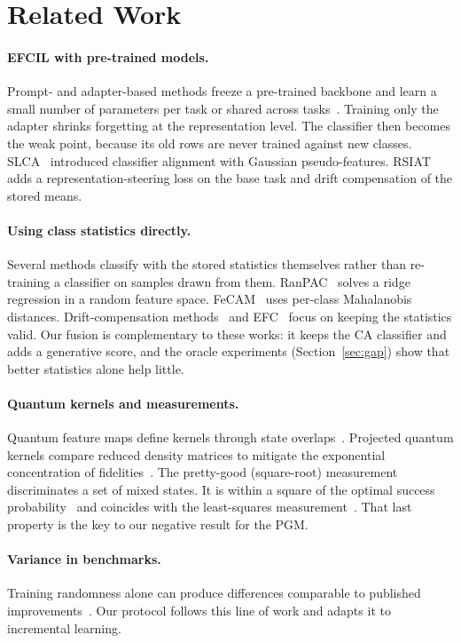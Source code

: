 \section{Related Work}
\label{sec:related}

\paragraph{EFCIL with pre-trained models.}
Prompt- and adapter-based methods freeze a pre-trained backbone and learn a
small number of parameters per task or shared across
tasks~\cite{wang2022l2p,zhou2024ease}. Training only the adapter shrinks
forgetting at the representation level. The classifier then becomes the
weak point, because its old rows are never trained against new classes.
SLCA~\cite{zhang2023slca} introduced classifier alignment with Gaussian
pseudo-features. RSIAT~\cite{rsiat} adds a representation-steering loss on
the base task and drift compensation of the stored means.

\paragraph{Using class statistics directly.}
Several methods classify with the stored statistics themselves rather than
re-training a classifier on samples drawn from them.
RanPAC~\cite{mcdonnell2023ranpac} solves a ridge regression in a random
feature space. FeCAM~\cite{goswami2023fecam} uses per-class Mahalanobis
distances. Drift-compensation methods~\cite{yu2020sdc,goswami2024adc,gomezvilla2024ldc}
and EFC~\cite{magistri2024efc} focus on keeping the statistics valid.
Our fusion is complementary to these works: it keeps the CA classifier and
adds a generative score, and the oracle experiments
(Section~\ref{sec:gap}) show that better statistics alone help little.

\paragraph{Quantum kernels and measurements.}
Quantum feature maps define kernels through state
overlaps~\cite{havlicek2019supervised,schuld2019feature}. Projected quantum kernels
compare reduced density matrices to mitigate the exponential concentration of
fidelities~\cite{huang2021power,thanasilp2024concentration}. The pretty-good
(square-root) measurement~\cite{hausladen1994pgm} discriminates a set of
mixed states. It is within a square of the optimal success
probability~\cite{barnum2002reversing} and coincides with the least-squares
measurement~\cite{eldar2001srm}. That last property is the key to our
negative result for the PGM.

\paragraph{Variance in benchmarks.}
Training randomness alone can produce differences comparable to published
improvements~\cite{bouthillier2021accounting}. Our protocol follows this line
of work and adapts it to incremental learning.
